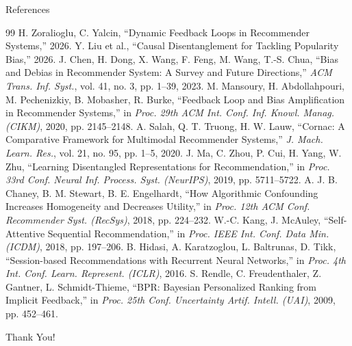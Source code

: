 \documentclass[11pt,aspectratio=43,xcolor=table]{beamer}
\begin{document}
\begin{frame}[allowframebreaks]{References}
  \footnotesize
  \begin{thebibliography}{99}
     H. Zoralioglu, C. Yalcin, ``Dynamic Feedback Loops in Recommender Systems,'' 2026.
     Y. Liu et al., ``Causal Disentanglement for Tackling Popularity Bias,'' 2026.
     J. Chen, H. Dong, X. Wang, F. Feng, M. Wang, T.-S. Chua, ``Bias and Debias in Recommender System: A Survey and Future Directions,'' \emph{ACM Trans. Inf. Syst.}, vol. 41, no. 3, pp. 1--39, 2023.
     M. Mansoury, H. Abdollahpouri, M. Pechenizkiy, B. Mobasher, R. Burke, ``Feedback Loop and Bias Amplification in Recommender Systems,'' in \emph{Proc. 29th ACM Int. Conf. Inf. Knowl. Manag. (CIKM)}, 2020, pp. 2145--2148.
     A. Salah, Q. T. Truong, H. W. Lauw, ``Cornac: A Comparative Framework for Multimodal Recommender Systems,'' \emph{J. Mach. Learn. Res.}, vol. 21, no. 95, pp. 1--5, 2020.
     J. Ma, C. Zhou, P. Cui, H. Yang, W. Zhu, ``Learning Disentangled Representations for Recommendation,'' in \emph{Proc. 33rd Conf. Neural Inf. Process. Syst. (NeurIPS)}, 2019, pp. 5711--5722.
     A. J. B. Chaney, B. M. Stewart, B. E. Engelhardt, ``How Algorithmic Confounding Increases Homogeneity and Decreases Utility,'' in \emph{Proc. 12th ACM Conf. Recommender Syst. (RecSys)}, 2018, pp. 224--232.
     W.-C. Kang, J. McAuley, ``Self-Attentive Sequential Recommendation,'' in \emph{Proc. IEEE Int. Conf. Data Min. (ICDM)}, 2018, pp. 197--206.
     B. Hidasi, A. Karatzoglou, L. Baltrunas, D. Tikk, ``Session-based Recommendations with Recurrent Neural Networks,'' in \emph{Proc. 4th Int. Conf. Learn. Represent. (ICLR)}, 2016.
     S. Rendle, C. Freudenthaler, Z. Gantner, L. Schmidt-Thieme, ``BPR: Bayesian Personalized Ranking from Implicit Feedback,'' in \emph{Proc. 25th Conf. Uncertainty Artif. Intell. (UAI)}, 2009, pp. 452--461.
  \end{thebibliography}
\end{frame}

\begin{frame}
  \centering
  \Huge Thank You!
\end{frame}
\end{document}
